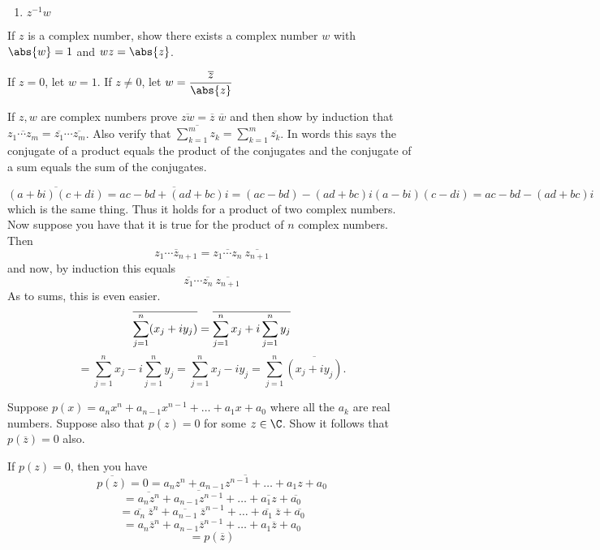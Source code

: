 \begin{enumialphparenastyle}
\begin{ex}
\begin{enumerate}
\item $z^{-1}w$

\end{enumerate}
\end{ex}

\begin{ex} If $z$ is a complex number, show there exists a complex
number $w$ with $\abs{w }=1$ and $wz=\abs{z}$. 
\begin{sol}
If $z=0$, let $w =1$. If $z\neq 0$, let $w =\displaystyle\frac{\overline{z}}{\abs{z}}$
\end{sol}
\end{ex}

\begin{ex} \label{exer-complex2}If $z,w$ are complex
 numbers prove $
\overline{zw}=\overline{z} \; \overline{w}$ and then show by induction that 
$\overline{z_{1}\cdots z_{m}}=\overline{z_{1}}\cdots \overline{z_{m}}$. Also
verify that $\overline{\sum_{k=1}^{m}z_{k}}=\sum_{k=1}^{m}\overline{z_{k}}$.
In words this says the conjugate of a product equals the product of the
conjugates and the conjugate of a sum equals the sum of the conjugates. 
\begin{sol}
\[
\overline{(a+bi) (c+di) }=\overline{ac-bd+(
ad+bc)i }=(ac-bd) -(ad+bc)i (
a-bi) (c-di) =ac-bd-(ad+bc)i 
\]
 which is the
same thing. Thus it holds for a product of two complex numbers. Now suppose
 you have that it is true for the product of $n$ complex numbers. Then
\[
\overline{z_{1}\cdots z_{n+1}}=\overline{z_{1}\cdots z_{n}}\ \overline{
z_{n+1}}
\]
and now, by induction this equals
\[
\overline{z_{1}}\cdots \overline{z_{n}}\ \overline{z_{n+1}}
\]
As to sums, this is even easier.
\[
\overline{\sum_{j=1}^{n}(x_{j}+iy_{j}) }=\overline{%
\sum_{j=1}^{n}x_{j}+i\sum_{j=1}^{n}y_{j}}
\]
\[
=\sum_{j=1}^{n}x_{j}-i\sum_{j=1}^{n}y_{j}=\sum_{j=1}^{n}x_{j}-iy_{j}=
\sum_{j=1}^{n}\overline{(x_{j}+iy_{j}) }.
\]
\end{sol}
\end{ex}

\begin{ex} \label{15-july-prob2}Suppose $p(x)
=a_{n}x^{n}+a_{n-1}x^{n-1}+\ldots +a_{1}x+a_{0}$ where all the $a_{k}$ are
real numbers. Suppose also that $p(z) =0$ for some $z\in \C$. Show it follows that $p(\overline{z}) =0$ also. 
\begin{sol}
If $p(z) =0$, then you have
\[
\overline{p(z) }=0=\overline{a_{n}z^{n}+a_{n-1}z^{n-1}+\ldots+a_{1}z+a_{0}}
\]
\[
=\overline{a_{n}z^{n}}+\overline{a_{n-1}z^{n-1}}+\ldots +\overline{a_{1}z}+
\overline{a_{0}}
\]
\[
=\overline{a_{n}}\ \overline{z}^{n}+\overline{a_{n-1}}\ \overline{z}
^{n-1}+\ldots +\overline{a_{1}}\ \overline{z}+\overline{a_{0}}
\]
\[
=a_{n}\overline{z}^{n}+a_{n-1}\overline{z}^{n-1}+\ldots +a_{1}\overline{z}
+a_{0}
\]
\[
=p(\overline{z})
\]
\end{sol}
\end{ex}


\end{enumialphparenastyle}
